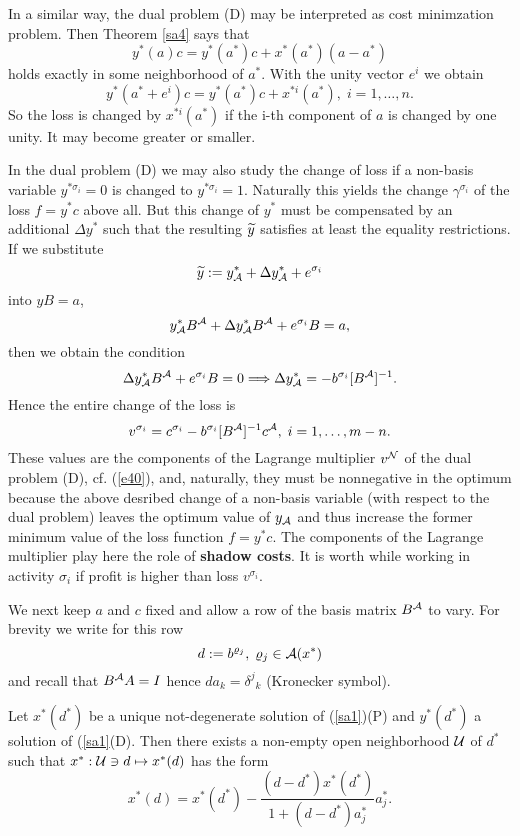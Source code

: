 \par
In a similar way, the dual problem (D) may be interpreted as cost minimzation
problem. Then Theorem \ref{sa4} says that
\[
y^*(a)c = y^*(a^*)c + x^*(a^*)(a - a^*)
\]
holds exactly in some neighborhood of $a^*$. With the unity vector $e^i$ we
obtain
\[
y^*(a^* + e^i)c = y^*(a^*)c + x^{*i}(a^*), \; i = 1, \ldots, n.
\]
So the loss is changed by $x^{*i}(a^*)$ if the i-th component of $a$ is changed
by one unity. It may become greater or smaller.
\par
In the dual problem (D) we may also study the change of loss if a non-basis
variable $y^{*\sigma _i} = 0$ is changed to $y^{*\sigma _i} = 1$.  Naturally
this yields the change $\gamma^{\sigma _i}$ of the loss $f = y^*c$ above
all.  But this change of $y^*$ must be compensated by an additional $\Delta
y^*$ such that the resulting $\widetilde{y}$ satisfies at least the equality
restrictions.  If we substitute
\[
\widetilde{y} := y^*_{{\cal A}} + \Delta y^*_{{\cal A}} + e^{\sigma _i}
\]
into $yB = a$,
\[
y^*_{{\cal A}}B^{{\cal A}} + \Delta y^*_{{\cal A}}B^{{\cal A}} + e^{\sigma _i}B = a,
\]
then we obtain the condition
\[
\Delta y^*_{{\cal A}}B^{{\cal A}} + e^{\sigma _i}B = 0 \Longrightarrow
\Delta y^*_{{\cal A}} = - b^{\sigma _i}[B^{{\cal A}}]^{-1}.
\]
Hence the entire change of the loss is
\[
v^{\sigma _i} = c^{\sigma _i} - b^{\sigma _i}[B^{{\cal A}}]^{-1}c^{{\cal A}},
\; i = 1, \ldots, m - n.
\]
These values are the components of the {\sc Lagrange} multiplier $v^{{\cal N}}$ of
the dual problem (D), cf. (\ref{e40}), and, naturally, they must be nonnegative
in the optimum because the above desribed change of a non-basis variable
(with respect to the dual problem) leaves the optimum value of $y_{{\cal A}}$ and
thus increase the former minimum value of the loss function $f = y^*c$.
The components of the {\sc Lagrange} multiplier play here the role of {\bf
shadow costs}.  It is worth while working in activity $\sigma _i$ if profit is
higher than loss $v^{\sigma _i}$.
\par
We next keep $a$ and $c$ fixed and allow a row of the basis matrix $B^{{\cal A}}$ to
vary. For brevity we write for this row
\[
d := b^{\varrho _j}, \; \varrho _j \in {\cal A}(x^*)
\]
and recall that $B^{{\cal A}}A = I$ hence $da_k = \delta^j{}_k$ ({\sc Kronecker}
symbol).
%
\begin{theorem} \label{sa5}
Let $x^*(d^*)$ be a unique not-degenerate solution of (\ref{sa1})(P) and
$y^*(d^*)$ a solution of (\ref{sa1}(D).  Then there exists a non-empty open
neighborhood $\cal U$ of $d^*$ such that $x^*:{\cal U} \ni d \mapsto x^*(d)$
has the form
\[
x^*(d) = x^*(d^*) - \frac{(d - d^*)x^*(d^*)}{1 + (d - d^*)a^*_j} a^*_j.
\]
\end{theorem}
